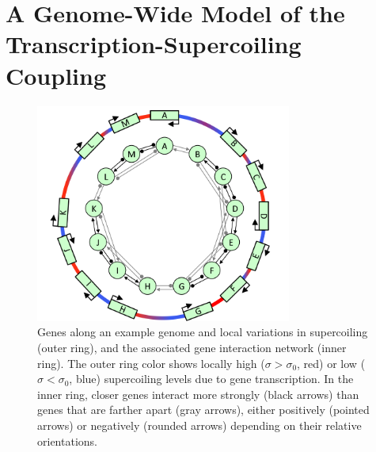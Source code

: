 
\section{A Genome-Wide Model of the Transcription-Supercoiling Coupling}
\label{sec:alife:indiv_model}

\begin{figure}[H]
\centering
\includegraphics[width=0.75\textwidth]{alife/img/reseau.png}
\caption[Hand-drawn genome and local interactions resulting from the TSC]{Genes along an example genome and local variations in supercoiling (outer ring), and the associated gene interaction network (inner ring).
The outer ring color shows locally high ($\sigma > \sigma_0$, red) or low ($\sigma < \sigma_0$, blue) supercoiling levels due to gene transcription.
In the inner ring, closer genes interact more strongly (black arrows) than genes that are farther apart (gray arrows), either positively (pointed arrows) or negatively (rounded arrows) depending on their relative orientations.}
\label{fig:alife:network}
\end{figure}


